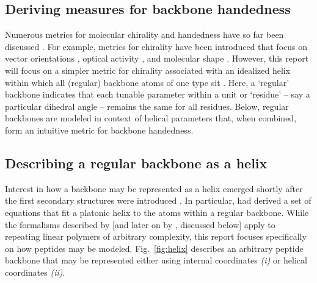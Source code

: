 \documentclass[fleqn,10pt,lineno]{wlpeerj} %
\newcommand{\n}[1]{{\color{blue}#1}}
\newcommand{\Fig}[1]{Fig.~\ref{#1}}
\begin{document}
\subsection*{Deriving measures for backbone handedness}
Numerous metrics for molecular chirality and handedness have so far been discussed \citep{Harris1999}. For example, metrics for chirality have been introduced that focus on vector orientations \citep{Kwiecinska2005,Kabsch1983,Gruziel2013}, optical activity \citep{Osipov1995}, and molecular shape \citep{Ferrarini1998}. However, this report will focus on a simpler metric for chirality associated with an idealized helix within which 
\n{all (regular) backbone atoms of one type sit} \citep{Shimanouchi1955,Miyazawa1961,Zacharias2013}. 
\n{Here, a `regular' backbone  indicates that each tunable parameter within a unit or `residue' -- say a particular dihedral angle -- remains the same for all residues. Below, regular backbones are modeled in context of helical parameters that, when combined, form an intuitive metric for backbone handedness.}

\subsection*{Describing a regular backbone as a helix} 
Interest in how a backbone may be represented as a helix emerged shortly after the first secondary structures were introduced \citep{Pauling1951,Pauling1951a,Pauling1951b}. In particular, \cite{Shimanouchi1955} had derived a set of equations that fit a platonic helix to the atoms within a regular backbone. 
\n{While the formalisms described by \cite{Shimanouchi1955} [and later on by \cite{Miyazawa1961}, discussed below] apply to repeating linear polymers of arbitrary complexity, %
this report focuses specifically on how peptides may be modeled.} \Fig{fig:helix} describes an arbitrary peptide backbone that may be represented either using internal coordinates \textit{(i)} or helical coordinates \textit{(ii)}. 
\end{document}
